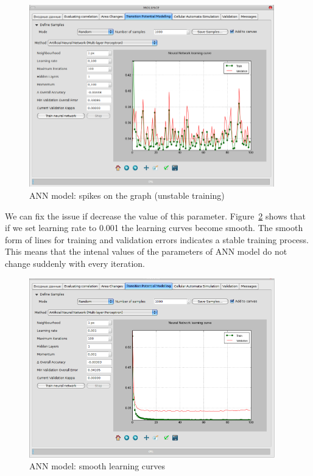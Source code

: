 \documentclass{report}
\begin{document}
\begin{figure}[h!]
\centering
\includegraphics[width=0.95\textwidth]{img/ann_spikes.png}
\caption{ANN model: spikes on the graph (unstable training)}
\label{fig:ann_spikes}
\end{figure}

We can fix the issue if decrease the value of this parameter. Figure~\ref{fig:ann_spikes_fxd} shows 
that if we set learning rate to 0.001 the learning curves become smooth. The smooth form of 
lines for training and validation errors indicates a stable training process. This means that the
intenal values of the parameters of ANN model do not change suddenly with every iteration. 


\begin{figure}[h!]
\centering
\includegraphics[width=0.95\textwidth]{img/ann_spikes_fxd.png}
\caption{ANN model: smooth learning curves}
\label{fig:ann_spikes_fxd}
\end{figure}
\end{document}
